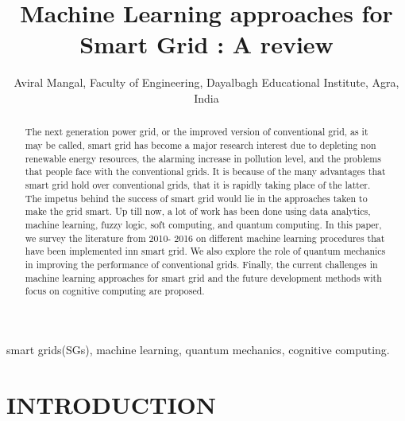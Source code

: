 \documentclass[12pt, twocolumn]{journal}
\begin{document}
\title{Machine Learning approaches for Smart Grid : A review}
\author{Aviral Mangal, Faculty of Engineering, Dayalbagh Educational Institute, Agra, India}
\begin{abstract}
 The next generation power grid, or the improved version of conventional grid, as it may be called, smart grid has become a major research interest due to depleting non renewable energy resources, the alarming increase in pollution level, and the problems that people face with the conventional grids. It is because of the many advantages that smart grid hold over conventional grids, that it is rapidly taking place of the latter. The impetus behind the success of smart grid would lie in the approaches taken to make the grid smart. Up till now, a lot of work has been done using data analytics, machine learning, fuzzy logic, soft computing, and quantum computing. In this paper, we survey the literature from 2010- 2016 on different machine learning procedures that have been implemented inn smart grid. We also explore the role of quantum mechanics in improving the performance of conventional grids. Finally, the current challenges in machine learning approaches for smart grid and the future development methods with focus on cognitive computing are proposed.
\end{abstract}
\begin{keywords}
smart grids(SGs), machine learning, quantum mechanics, cognitive computing.
\end{keywords}
\section{INTRODUCTION}
\end{document}
